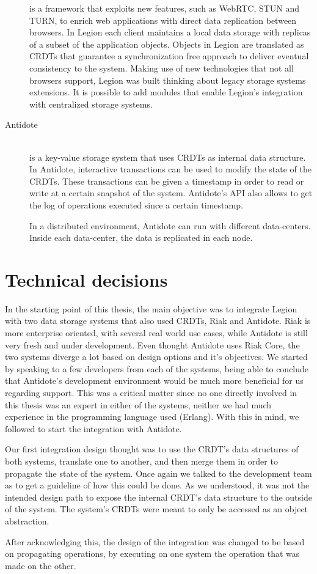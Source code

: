 \begin{description}
is a framework that exploits new features, such as WebRTC, STUN and TURN, to enrich web applications with direct data replication between browsers. In Legion each client maintains a local data storage with replicas of a subset of the application objects. Objects in Legion are translated as CRDTs that guarantee a synchronization free approach to deliver eventual consistency to the system. Making use of new technologies that not all browsers support, Legion was built thinking about legacy storage systems extensions. It is possible to add modules that enable Legion's integration with centralized storage systems.

\item[Antidote] \hfill \\
is a key-value storage system that uses CRDTs as internal data structure. In Antidote, interactive transactions can be used to modify the state of the CRDTs. These transactions can be given a timestamp in order to read or write at a certain snapshot of the system. Antidote's API also allows to get the log of operations executed since a certain timestamp.\par
	In a distributed environment, Antidote can run with different data-centers. Inside each data-center, the data is replicated in each node.

\end{description}

\section{Technical decisions}
\label{sec:technical_decisions}
In the starting point of this thesis, the main objective was to integrate Legion with two data storage systems that also used CRDTs, Riak and Antidote. Riak is more enterprise oriented, with several real world use cases, while Antidote is still very fresh and under development. Even thought Antidote uses Riak Core, the two systems diverge a lot based on design options and it's objectives. We started by speaking to a few developers from each of the systems, being able to conclude that Antidote's development environment would be much more beneficial for us regarding support. This was a critical matter since no one directly involved in this thesis was an expert in either of the systems, neither we had much experience in the programming language used (Erlang). With this in mind, we followed to start the integration with Antidote.\par
Our first integration design thought was to use the CRDT's data structures of both systems, translate one to another, and then merge them in order to propagate the state of the system. Once again we talked to the development team as to get a guideline of how this could be done. As we understood, it was not the intended design path to expose the internal CRDT's data structure to the outside of the system. The system's CRDTs were meant to only be accessed as an object abstraction.\par
After acknowledging this, the design of the integration was changed to be based on propagating operations, by executing on one system the operation that was made on the other.


